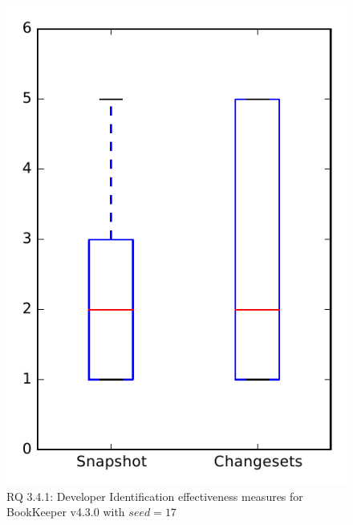 
\begin{figure}
\centering
\includegraphics[height=0.4\textheight]{figures/dit_seed/rq1_bookkeeper_17}
\caption{RQ 3.4.1: Developer Identification effectiveness measures for BookKeeper v4.3.0 with $seed=17$}
\label{fig:dit_seed:rq1:bookkeeper}
\end{figure}
